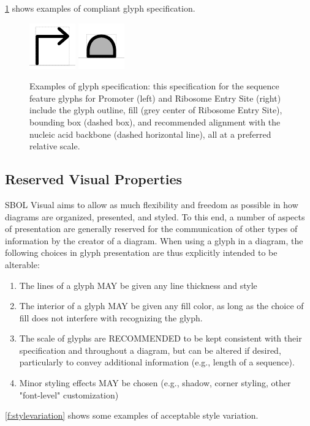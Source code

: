 \ref{f:specexample} shows examples of compliant glyph specification.

\begin{figure}[h!]
\centering
\includegraphics[scale=2.0]{figures/promoter-specification.pdf}
\includegraphics[scale=2.0]{figures/ribosome-entry-site-specification.pdf}
\caption{Examples of glyph specification: this specification for the sequence feature glyphs for Promoter (left) and Ribosome Entry Site (right) include the glyph outline, fill (grey center of Ribosome Entry Site), bounding box (dashed box), and recommended alignment with the nucleic acid backbone (dashed horizontal line), all at a preferred relative scale.}
\label{f:specexample}
\end{figure}

\subsection{Reserved Visual Properties}

SBOL Visual aims to allow as much flexibility and freedom as possible in how diagrams are organized, presented, and styled.
%
To this end, a number of aspects of presentation are generally reserved for the communication of other types of information by the creator of a diagram.
%
When using a glyph in a diagram, the following choices in glyph presentation are thus explicitly intended to be alterable:
\begin{enumerate}
\item The lines of a glyph MAY be given any line thickness and style
\item The interior of a glyph MAY be given any fill color, as long as the choice of fill does not interfere with recognizing the glyph.
\item The scale of glyphs are RECOMMENDED to be kept consistent with their specification and throughout a diagram, but can be altered if desired, particularly to convey additional information (e.g., length of a sequence).
\item Minor styling effects MAY be chosen (e.g., shadow, corner styling, other "font-level" customization)
\end{enumerate}
\ref{f:stylevariation} shows some examples of acceptable style variation.

